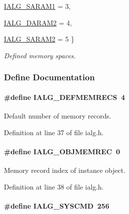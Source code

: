 \begin{CompactItemize}
\par
\hyperlink{group__ti__xdais___i_a_l_g_gg262eb64dc7343999fa07d535ae1634974ac938c5e58e4d4a30458b63869f0095}{IALG\_\-SARAM1} =  3, 
\par
\hyperlink{group__ti__xdais___i_a_l_g_gg262eb64dc7343999fa07d535ae16349717fc19eac565b29871efbfed54760414}{IALG\_\-DARAM2} =  4, 
\par
\hyperlink{group__ti__xdais___i_a_l_g_gg262eb64dc7343999fa07d535ae1634976db79aaafcf9b4354f2828c2a94b8590}{IALG\_\-SARAM2} =  5
 \}
\begin{CompactList}\small\item\em Defined memory spaces. \item\end{CompactList}\end{CompactItemize}


\subsubsection{Define Documentation}
\hypertarget{group__ti__xdais___i_a_l_g_g8a220fa863380937542f6a38be47ceda}{
\paragraph[IALG\_\-DEFMEMRECS]{\setlength{\rightskip}{0pt plus 5cm}\#define IALG\_\-DEFMEMRECS~4}\hfill}
\label{group__ti__xdais___i_a_l_g_g8a220fa863380937542f6a38be47ceda}


Default number of memory records. 

Definition at line 37 of file ialg.h.\hypertarget{group__ti__xdais___i_a_l_g_g0e3202a4d8dc0bd3cb300633922ffd54}{
\paragraph[IALG\_\-OBJMEMREC]{\setlength{\rightskip}{0pt plus 5cm}\#define IALG\_\-OBJMEMREC~0}\hfill}
\label{group__ti__xdais___i_a_l_g_g0e3202a4d8dc0bd3cb300633922ffd54}


Memory record index of instance object. 

Definition at line 38 of file ialg.h.\hypertarget{group__ti__xdais___i_a_l_g_g200f155f9e2720011270e99f17bb6675}{
\paragraph[IALG\_\-SYSCMD]{\setlength{\rightskip}{0pt plus 5cm}\#define IALG\_\-SYSCMD~256}\hfill}
\label{group__ti__xdais___i_a_l_g_g200f155f9e2720011270e99f17bb6675}


